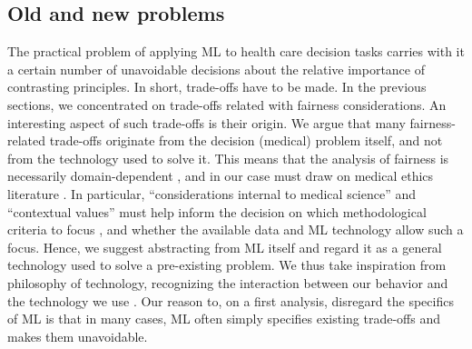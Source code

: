 \subsection{Old and new problems}
    The practical problem of applying ML to health care decision tasks carries with it a certain number of unavoidable decisions about the relative importance of contrasting principles.
    In short, trade-offs have to be made.
    In the previous sections, we concentrated on trade-offs related with fairness considerations.
    An interesting aspect of such trade-offs is their origin.
    We argue that many fairness-related trade-offs originate from the decision (medical) problem itself, and not from the technology used to solve it.
    This means that the analysis of fairness is necessarily domain-dependent \cite{Fletcher2021}, and in our case must draw on medical ethics literature \cite{Morley2020}.
    In particular, ``considerations internal to medical science'' and ``contextual values'' must help inform the decision on which methodological criteria to focus \cite[p.~252]{Ho2011}, and whether the available data and ML technology allow such a focus.
    Hence, we suggest abstracting from ML itself and regard it as a general technology used to solve a pre-existing problem.
    We thus take inspiration from philosophy of technology, recognizing the interaction between our behavior and the technology we use \cite{Dijkstra2020}.
    Our reason to, on a first analysis, disregard the specifics of ML is that in many cases, ML often simply specifies existing trade-offs and makes them unavoidable.


